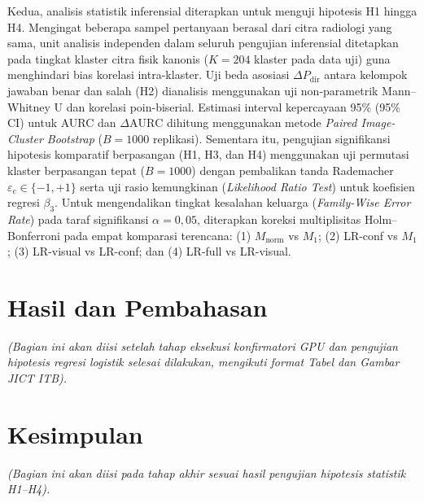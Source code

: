 \documentclass[a4paper,10pt,twoside]{article}
\begin{document}
Kedua, analisis statistik inferensial diterapkan untuk menguji hipotesis H1 hingga H4. Mengingat beberapa sampel pertanyaan berasal dari citra radiologi yang sama, unit analisis independen dalam seluruh pengujian inferensial ditetapkan pada tingkat klaster citra fisik kanonis ($K = 204$ klaster pada data uji) guna menghindari bias korelasi intra-klaster. Uji beda asosiasi $\Delta P_{\mathrm{dir}}$ antara kelompok jawaban benar dan salah (H2) dianalisis menggunakan uji non-parametrik Mann--Whitney U dan korelasi poin-biserial. Estimasi interval kepercayaan 95\% (95\% CI) untuk AURC dan $\Delta \mathrm{AURC}$ dihitung menggunakan metode \textit{Paired Image-Cluster Bootstrap} ($B = 1000$ replikasi). Sementara itu, pengujian signifikansi hipotesis komparatif berpasangan (H1, H3, dan H4) menggunakan uji permutasi klaster berpasangan tepat ($B = 1000$) dengan pembalikan tanda Rademacher $\varepsilon_c \in \{-1, +1\}$ serta uji rasio kemungkinan (\textit{Likelihood Ratio Test}) untuk koefisien regresi $\beta_3$. Untuk mengendalikan tingkat kesalahan keluarga (\textit{Family-Wise Error Rate}) pada taraf signifikansi $\alpha = 0{,}05$, diterapkan koreksi multiplisitas Holm--Bonferroni pada empat komparasi terencana: (1) $M_{\mathrm{norm}}$ vs $M_1$; (2) LR-conf vs $M_1$; (3) LR-visual vs LR-conf; dan (4) LR-full vs LR-visual.

\section{Hasil dan Pembahasan}
\textit{(Bagian ini akan diisi setelah tahap eksekusi konfirmatori GPU dan pengujian hipotesis regresi logistik selesai dilakukan, mengikuti format Tabel dan Gambar JICT ITB).}

\section{Kesimpulan}
\textit{(Bagian ini akan diisi pada tahap akhir sesuai hasil pengujian hipotesis statistik H1–H4).}

\end{document}
